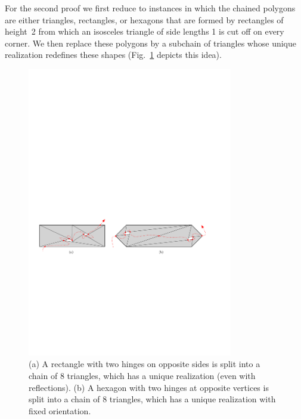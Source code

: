 \documentclass[runningheads]{article}
\begin{document}
For the second proof we first reduce to instances in which the chained polygons are either triangles, rectangles, or hexagons
that are formed by rectangles of height~2 from which an isosceles triangle of side lengths 1 is cut off on every corner.
We then replace these polygons by a subchain of triangles whose unique realization redefines these shapes (Fig.~\ref{fig:triangles} depicts this idea).
%
\begin{figure}[htbp]
  \centering
 \includegraphics[width=0.8\textwidth]{fig-triangles}
\caption{\small (a) A rectangle with two hinges on opposite sides is split into a chain of 8 triangles, which has a unique realization (even with reflections).
(b) A hexagon with two hinges at opposite vertices is split into a chain of 8 triangles,
which has a unique realization with fixed orientation.}
\label{fig:triangles}
\end{figure}

\end{document}
